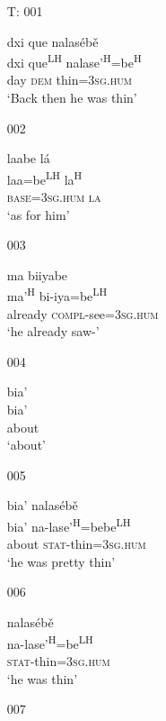 

\begin{itemize}

\item[T: 001]
   
\glll dxi que nalas\'{e}b\v{e}\\
dxi que\textsuperscript{LH} nalase'\textsuperscript{H}=be\textsuperscript{H}\\
day \textsc{dem} thin=\textsc{3sg.hum}\\
\glt `Back then he was thin'


\item[002]
    
\glll laabe l\'{a}\\
laa=be\textsuperscript{LH} la\textsuperscript{H} \\
 \textsc{base}=\textsc{3sg.hum} \textsc{la}\\
\glt `as for him'
 

\item[003]
   
\glll ma biiyabe \\
ma'\textsuperscript{H} bi-iya=be\textsuperscript{LH} \\
already \textsc{compl}-see=\textsc{3sg.hum} \\
\glt `he already saw-'
 

\item[004]
   
\glll bia'\\
bia'\\
about\\
\glt `about'
 

\item[005]
   
\glll bia' nalas\'{e}b\v{e}\\
bia' na-lase'\textsuperscript{H}=bebe\textsuperscript{LH} \\
about \textsc{stat}-thin=\textsc{3sg.hum}\\
\glt `he was pretty thin' 
 

\item[006]
   
\glll nalas\'{e}b\v{e}\\
na-lase'\textsuperscript{H}=be\textsuperscript{LH} \\
\textsc{stat}-thin=\textsc{3sg.hum}\\
\glt `he was thin'
 

\item[007]
   

\end{itemize}
